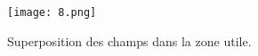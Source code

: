 \documentclass[12pt,a4paper]{article}
\begin{document}
\begin{figure}[h]
    \centering
    \texttt{[image: 8.png]}
    \caption{Superposition des champs dans la zone utile.}
    \label{fig:superposition_zone}
\end{figure}








\end{document}
